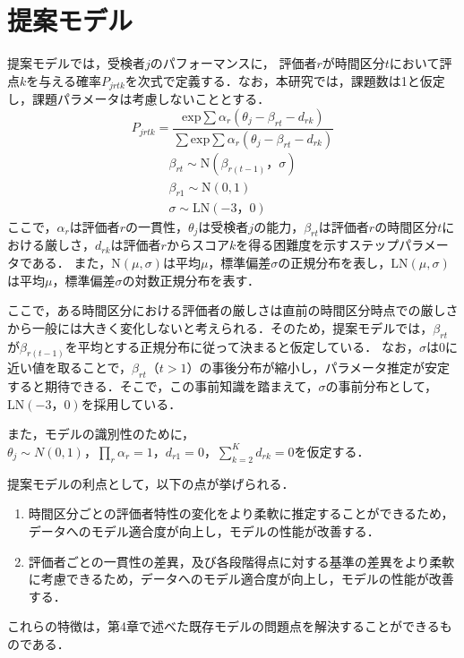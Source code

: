 \documentclass[a4paper,11pt,oneside,openany]{jsbook}
\begin{document}
\chapter{提案モデル}
提案モデルでは，受検者$j$のパフォーマンスに， 評価者$r$が時間区分$t$において評点$k$を与える確率$P_{jrtk}$を次式で定義する．なお，本研究では，課題数は1と仮定し，課題パラメータは考慮しないこととする．
\begin{equation}
P_{jrtk}=\frac{\mathrm{exp}\sum{\alpha_r(\theta_{j}-\beta_{rt}-d_{rk})}}{\sum \mathrm{exp}\sum{\alpha_r(\theta_{j}-\beta_{rt}-d_{rk})}}
\end{equation}
\begin{eqnarray}
  \beta_{rt}\sim \mathrm{N}(\beta_{r(t-1)}，\sigma)\nonumber\\
  \beta_{r1} \sim \mathrm{N}(0,1)\nonumber\\
  \sigma \sim \mathrm{LN}(-3，0)\nonumber
\end{eqnarray}
ここで，$\alpha_{r}$は評価者$r$の一貫性，$\theta_{j}$は受検者$j$の能力，$\beta_{rt}は$評価者$r$の時間区分$t$における厳しさ，$d_{rk}$は評価者$r$からスコア$k$を得る困難度を示すステップパラメータである．
また，$\mathrm{N}(\mu,\sigma)$は平均$\mu$，標準偏差$\sigma$の正規分布を表し，$\mathrm{LN}(\mu,\sigma)$は平均$\mu$，標準偏差$\sigma$の対数正規分布を表す．

ここで，ある時間区分における評価者の厳しさは直前の時間区分時点での厳しさから一般には大きく変化しないと考えられる．そのため，提案モデルでは，$\beta_{rt}$が$\beta_{r(t-1)}$を平均とする正規分布に従って決まると仮定している．
なお，$\sigma$は0に近い値を取ることで，$\beta_{rt}（t>1）$の事後分布が縮小し，パラメータ推定が安定すると期待できる．そこで，この事前知識を踏まえて，$\sigma$の事前分布として，$\mathrm{LN}(-3，0)$を採用している．

また，モデルの識別性のために，$\theta_{j}\sim N(0,1)，\prod_{r}\alpha_r=1，d_{r1}=0，\sum_{k=2}^{K}d_{rk}=0$を仮定する．

提案モデルの利点として，以下の点が挙げられる．
\begin{enumerate}
  \item 時間区分ごとの評価者特性の変化をより柔軟に推定することができるため，データへのモデル適合度が向上し，モデルの性能が改善する．
  \item 評価者ごとの一貫性の差異，及び各段階得点に対する基準の差異をより柔軟に考慮できるため，データへのモデル適合度が向上し，モデルの性能が改善する．
\end{enumerate}
これらの特徴は，第4章で述べた既存モデルの問題点を解決することができるものである．
\end{document}
